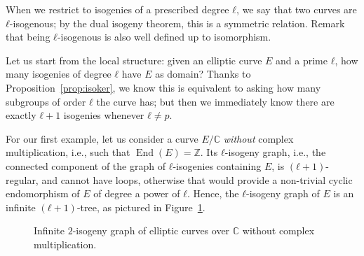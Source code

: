 \documentclass[10pt]{article}
\theoremstyle{plain}
\theoremstyle{definition}
\DeclareMathOperator{\End}{End} %
\begin{document}
\begin{prposition}
When we restrict to isogenies of a prescribed degree $ℓ$, we say that
two curves are $ℓ$-isogenous; by the dual isogeny theorem, this is a
symmetric relation. %
Remark that being $ℓ$-isogenous is also well defined up to
isomorphism.

Let us start from the local structure: given an elliptic curve $E$ and
a prime $ℓ$, how many isogenies of degree $ℓ$ have $E$ as domain? %
Thanks to Proposition~\ref{prop:isoker}, we know this is equivalent to
asking how many subgroups of order $ℓ$ the curve has; but then we
immediately know there are exactly $ℓ+1$ isogenies whenever $ℓ≠p$.

For our first example, let us consider a curve $E/ℂ$ \emph{without}
complex multiplication, i.e., such that $\End(E)=ℤ$.  %
Its $ℓ$-isogeny graph, i.e., the connected component of the graph of
$ℓ$-isogenies containing $E$, is $(ℓ+1)$-regular, and cannot have
loops, otherwise that would provide a non-trivial cyclic endomorphism of $E$
of degree a power of $ℓ$. %
Hence, the $ℓ$-isogeny graph of $E$ is an infinite $(ℓ+1)$-tree, as
pictured in Figure~\ref{fig:infinite-tree}. %

\begin{figure}
  \centering
  
    \caption{Infinite $2$-isogeny graph of elliptic curves over $ℂ$
      without complex multiplication.}
  \label{fig:infinite-tree}
\end{figure}


\end{prposition}
\end{document}
